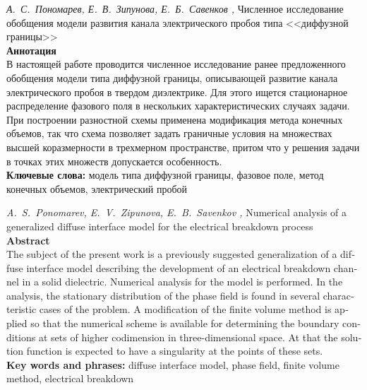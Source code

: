 \documentclass[a4paper,12pt]{article}
\theoremstyle{plain}
\theoremstyle{remark}
\newcommand{\PreprintTitle}{%
	Численное исследование обобщения модели развития канала электрического пробоя типа <<диффузной границы>>%
}
\newcommand{\PreprintTitleEnglish}{%
	Numerical analysis of a generalized diffuse interface model for the electrical breakdown process%
}
\newcommand{\PreprintAuthors}{%
	А.~С.~Пономарев, Е.~В.~Зипунова, Е.~Б.~Савенков%
}
\newcommand{\PreprintAuthorsEnglish}{%
	A.~S.~Ponomarev, E.~V.~Zipunova, E.~B.~Savenkov%
}
\begin{document}
\noindent \emph{\PreprintAuthors,} \PreprintTitle \\[3mm]
\textbf{Аннотация} \\
{
	\small
	В настоящей работе проводится численное исследование ранее предложенного обобщения модели типа диффузной границы, описывающей развитие канала электрического пробоя в твердом диэлектрике. Для этого ищется стационарное распределение фазового поля в нескольких характеристических случаях задачи. При построении разностной схемы применена модификация метода конечных объемов, так что схема позволяет задать граничные условия на множествах высшей коразмерности в трехмерном пространстве, притом что у решения задачи в точках этих множеств допускается особенность. \\[3mm]
	\textbf{Ключевые слова:} модель типа диффузной границы, фазовое поле, метод конечных объемов, электрический пробой \\[5mm]
}
\begin{otherlanguage}{english}
\emph{\PreprintAuthorsEnglish,} \PreprintTitleEnglish \\[3mm]
\textbf{Abstract} \\
{
	\small
	The subject of the present work is a previously suggested generalization of a diffuse interface model describing the development of an electrical breakdown channel in a solid dielectric. Numerical analysis for the model is performed. In the analysis, the stationary distribution of the phase field is found in several characteristic cases of the problem. A modification of the finite volume method is applied so that the numerical scheme is available for determining the boundary conditions at sets of higher codimension in three-dimensional space. At that the solution function is expected to have a singularity at the points of these sets. \\[3mm]
	\textbf{Key words and phrases:} diffuse interface model, phase field, finite volume method, electrical breakdown \\[5mm]
}
\end{otherlanguage}

\clearpage













\clearpage
\printbibliography[
	heading=bibintoc
]

\clearpage
\tableofcontents
\end{document}
